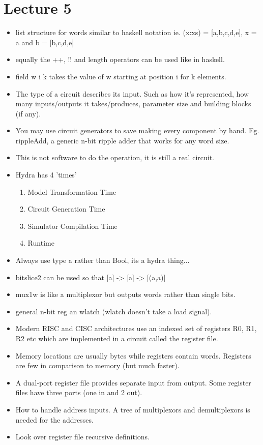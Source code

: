 \documentclass{article}
\begin{document}
\section*{Lecture 5}
\begin{itemize}
\item list structure for words similar to haskell notation ie. (x:xs) = [a,b,c,d,e], x = a and b = [b,c,d,e]
\item equally the ++, !! and length operators can be used like in haskell.
\item field w i k takes the value of w starting at position i for k elements.
\item The type of a circuit describes its input. Such as how it's represented, how many inputs/outputs it takes/produces, parameter size and building blocks (if any).
\item You may use circuit generators to save making every component by hand. Eg. rippleAdd, a generic n-bit ripple adder that works for any word size.
\item This is not software to do the operation, it is still a real circuit.
\item Hydra has 4 'times'
\begin{enumerate}
\item Model Transformation Time
\item Circuit Generation Time
\item Simulator Compilation Time
\item Runtime
\end{enumerate}
\item Always use type a rather than Bool, its a hydra thing...
\item bitslice2 can be used so that [a] -> [a] -> [(a,a)]
\item mux1w is like a multiplexor but outputs words rather than single bits.
\item general n-bit reg an wlatch (wlatch doesn't take a load signal).
\item Modern RISC and CISC architectures use an indexed set of registers R0, R1, R2 etc which are implemented in a circuit called the register file.
\item Memory locations are usually bytes while registers contain words. Registers are few in comparison to memory (but much faster).
\item A dual-port register file provides separate input from output. Some register files have three ports (one in and 2 out).
\item How to handle address inputs. A tree of multiplexors and demultiplexors is needed for the addresses.
\item Look over register file recursive definitions.
\end{itemize}
\end{document}
